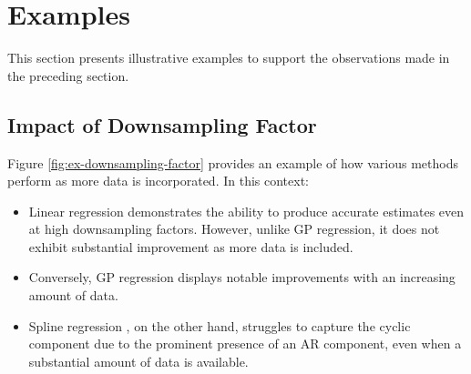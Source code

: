 \section{Examples}
This section presents illustrative examples to support the observations made in
the preceding section.


\subsection{Impact of Downsampling Factor}


Figure \ref{fig:ex-downsampling-factor} provides an example of how various
methods perform as more data is incorporated. In this context:

\begin{itemize}
    \item Linear regression demonstrates the ability to produce accurate estimates even
    at high downsampling factors. However, unlike GP regression, it does not exhibit
    substantial improvement as more data is included.
    \item Conversely, GP regression displays notable improvements with an
    increasing amount of data.
    \item Spline regression , on the other hand, struggles to capture the cyclic
    component due to the prominent presence of an AR component, even when a
    substantial amount of data is available.
\end{itemize}

